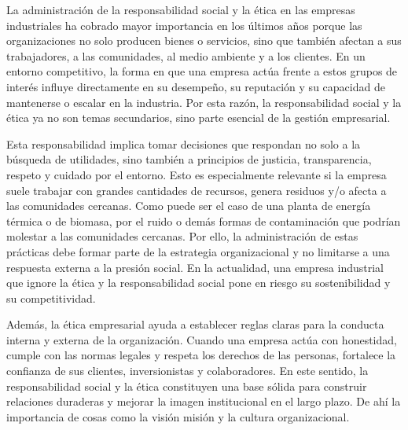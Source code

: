 La administración de la responsabilidad social y la ética en las empresas industriales ha cobrado mayor importancia en los últimos años porque las organizaciones no solo producen bienes o servicios, sino que también afectan a sus trabajadores, a las comunidades, al medio ambiente y a los clientes. En un entorno competitivo, la forma en que una empresa actúa frente a estos grupos de interés influye directamente en su desempeño, su reputación y su capacidad de mantenerse o escalar en la industria. Por esta razón, la responsabilidad social y la ética ya no son temas secundarios, sino parte esencial de la gestión empresarial.

Esta responsabilidad implica tomar decisiones que respondan no solo a la búsqueda de utilidades, sino también a principios de justicia, transparencia, respeto y cuidado por el entorno. Esto es especialmente relevante si la empresa suele trabajar con grandes cantidades de recursos, genera residuos y/o afecta a las comunidades cercanas. Como puede ser el caso de una planta de energía térmica o de biomasa, por el ruido o demás formas de contaminación que podrían molestar a las comunidades cercanas. Por ello, la administración de estas prácticas debe formar parte de la estrategia organizacional y no limitarse a una respuesta externa a la presión social. En la actualidad, una empresa industrial que ignore la ética y la responsabilidad social pone en riesgo su sostenibilidad y su competitividad.

Además, la ética empresarial ayuda a establecer reglas claras para la conducta interna y externa de la organización. Cuando una empresa actúa con honestidad, cumple con las normas legales y respeta los derechos de las personas, fortalece la confianza de sus clientes, inversionistas y colaboradores. En este sentido, la responsabilidad social y la ética constituyen una base sólida para construir relaciones duraderas y mejorar la imagen institucional en el largo plazo. De ahí la importancia de cosas como la visión misión y la cultura organizacional.
